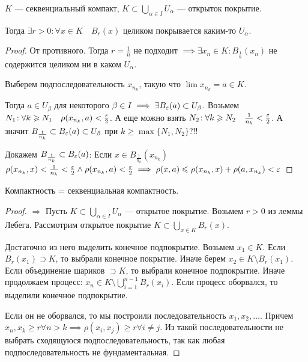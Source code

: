 \begin{lemma}
    $K$ --- секвенциальный компакт,  $K \subset \bigcup\limits_{\alpha \in I} U_\alpha$ --- открыток покрытие.

    Тогда  $\exists r > 0\!: \forall x \in K\quad B_r(x)$ целиком покрывается каким-то  $U_\alpha$.
\end{lemma}
\begin{proof}
    От противного. Тогда $r = \frac{1}{n}$ не подходит $\implies \exists x_n \in K\!: B_{\frac{1}{n}}(x_n)$ не содержится целиком ни в каком $U_\alpha$.

    Выберем подпоследовательность $x_{n_k}$, такую что  $\lim x_{n_k} = a \in K$.

    Тогда  $a \in U_\beta$ для некоторого  $\beta \in I \implies \exists B_\varepsilon(a) \subset U_\beta$. Возьмем  $N_1\!: \forall k \geqslant N_1\quad \rho(x_{n_k}, a) < \frac{\varepsilon}{2}$. А еще можно взять $N_2\!: \forall k \geqslant N_2\quad \frac{1}{n_k} < \frac{\varepsilon}{2}$. А значит $B_{\frac{1}{n_{k}}} \subset B_\varepsilon(a) \subset U_\beta$ при $k \ge \max\{N_1, N_2\}$?!!

    Докажем $B_{\frac{1}{n_{k}}} \subset B_\varepsilon(a)$: Если $x \in B_{\frac{1}{n_k}}(x_{n_k})$  $\rho(x_{n_k}, x) < \frac{1}{n_k} < \frac{\varepsilon}{2} \land \rho(x_{n_k}, a) < \frac{\varepsilon}{2} \implies \rho(x, a) \leqslant \rho(x_{n_k}, x) + \rho(a, x_{n_k}) < \varepsilon$ 
\end{proof}
\begin{theorem}
    Компактность = секвенциальная компактность.
\end{theorem}
\begin{proof}
    $\Rightarrow$ Пусть  $K \subset \bigcup\limits_{\alpha \in I} U_\alpha$ --- открытое покрытие. Возьмем $r > 0$ из леммы Лебега. Рассмотрим открытое покрытие  $K \subset \bigcup\limits_{x \in K} B_r(x)$. 

    Достаточно из него выделить конечное подпокрытие. Возьмем  $x_1 \in K$. Если $B_r(x_1) \supset K$, то выбрали конечное покрытие. Иначе берем $x_2 \in K \setminus B_r(x_1)$. Если объединение шариков $\supset K$, то выбрали конечное подпокрытие. Иначе продолжаем процесс:  $x_n \in K \setminus \bigcup_{i=1}^{n-1}B_r(x_i)$. Если процесс оборвался, то выделили конечное подпокрытие.

    Если он не оборвался, то мы построили последовательность $x_1, x_2,\ldots$. Причем  $x_n, x_k \ge r \forall n > k \implies \rho(x_i, x_j) \ge r \forall i \ne j$. Из такой последовательности не выбрать сходящуюся подпоследовательность, так как любая подпоследовательность не фундаментальная.
\end{proof}
